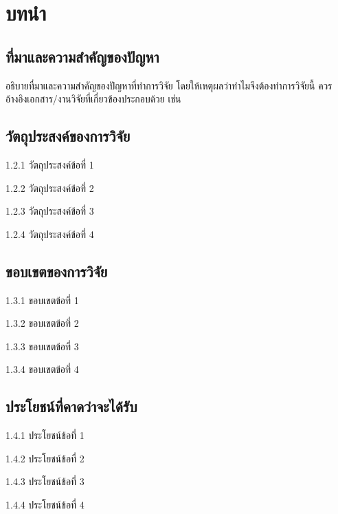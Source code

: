 
\chapter{บทนำ}

\section{ที่มาและความสำคัญของปัญหา}

อธิบายที่มาและความสำคัญของปัญหาที่ทำการวิจัย โดยให้เหตุผลว่าทำไมจึงต้องทำการวิจัยนี้
ควรอ้างอิงเอกสาร/งานวิจัยที่เกี่ยวข้องประกอบด้วย เช่น \cite{ref1}

\section{วัตถุประสงค์ของการวิจัย}

\begin{sublist}
  \item[1.2.1] วัตถุประสงค์ข้อที่ 1
  \item[1.2.2] วัตถุประสงค์ข้อที่ 2
  \item[1.2.3] วัตถุประสงค์ข้อที่ 3
  \item[1.2.4] วัตถุประสงค์ข้อที่ 4
\end{sublist}

\section{ขอบเขตของการวิจัย}

\begin{sublist}
  \item[1.3.1] ขอบเขตข้อที่ 1
  \item[1.3.2] ขอบเขตข้อที่ 2
  \item[1.3.3] ขอบเขตข้อที่ 3
  \item[1.3.4] ขอบเขตข้อที่ 4
\end{sublist}

\section{ประโยชน์ที่คาดว่าจะได้รับ}
\begin{sublist}
  \item[1.4.1] ประโยชน์ข้อที่ 1
  \item[1.4.2] ประโยชน์ข้อที่ 2
  \item[1.4.3] ประโยชน์ข้อที่ 3
  \item[1.4.4] ประโยชน์ข้อที่ 4
\end{sublist}
